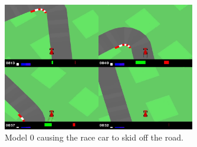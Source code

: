 \begin{figure}[htbp]
    \centering
    \includegraphics[width=0.75\textwidth]{figures/images/car_fail.png}
    \caption{Model 0 causing the race car to skid off the road.}
    \label{fig:car_racing_fail}
\end{figure}

